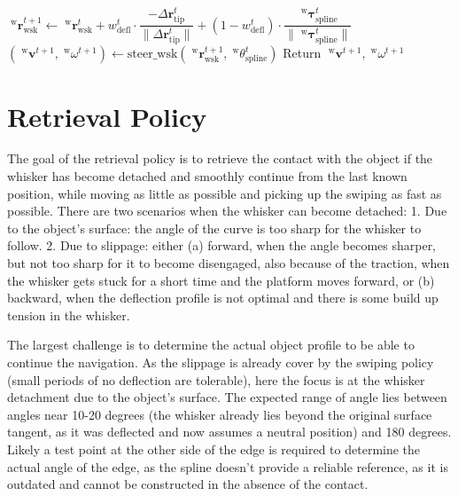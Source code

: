 \begin{algorithm}[htb]
\begin{algorithmic}
        \State \(\;^{\mathrm{w}}\boldsymbol{r}_{\mathrm{wsk}}^{t+1} \gets \;^{\mathrm{w}}\boldsymbol{r}_{\mathrm{wsk}}^{t} + w_{\mathrm{defl}}^{t} \cdot \dfrac{-\Delta\boldsymbol{r}_{\mathrm{tip}}^{t}}{\|\Delta\boldsymbol{r}_{\mathrm{tip}}^{t}\|} + (1 - w_{\mathrm{defl}}^{t}) \cdot \dfrac{\;^{\mathrm{w}}\boldsymbol{\tau}_{\mathrm{spline}}^{t}}{\|\;^{\mathrm{w}}\boldsymbol{\tau}_{\mathrm{spline}}^{t}\|}\) 
        \State
        \State
        \State \((\;^{\mathrm{w}}\boldsymbol{v}^{t+1}, \;^{\mathrm{w}}\omega^{t+1}) \gets \mathrm{steer\_wsk}(\;^{\mathrm{w}}\boldsymbol{r}_{\mathrm{wsk}}^{t+1},\;^{\mathrm{w}}\theta_{\mathrm{spline}}^{t})\)
        \State Return \(\;^{\mathrm{w}}\boldsymbol{v}^{t+1}, \;^{\mathrm{w}}\omega^{t+1}\)
    \end{algorithmic}
    \label{alg:swiping_policy}
\end{algorithm}


\section{Retrieval Policy}

The goal of the retrieval policy is to retrieve the contact with the object if the whisker has become detached and smoothly continue from the last known position, while moving as little as possible and picking up the swiping as fast as possible.
There are two scenarios when the whisker can become detached:
1. Due to the object's surface: the angle of the curve is too sharp for the whisker to follow.
2. Due to slippage:
either (a) forward, when the angle becomes sharper, but not too sharp for it to become disengaged, also because of the traction, when the whisker gets stuck for a short time and the platform moves forward,
or (b) backward, when the deflection profile is not optimal and there is some build up tension in the whisker.

The largest challenge is to determine the actual object profile to be able to continue the navigation.
As the slippage is already cover by the swiping policy (small periods of no deflection are tolerable), here the focus is at the whisker detachment due to the object's surface.
The expected range of angle lies between angles near 10-20 degrees (the whisker already lies beyond the original surface tangent, as it was deflected and now assumes a neutral position) and 180 degrees.
Likely a test point at the other side of the edge is required to determine the actual angle of the edge, as the spline doesn't provide a reliable reference, as it is outdated and cannot be constructed in the absence of the contact.

